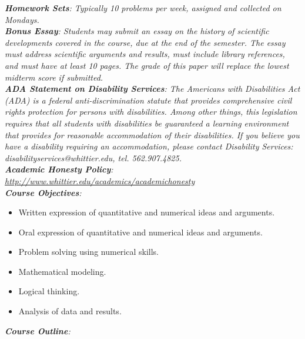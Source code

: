 \documentclass[10pt]{article}
\begin{document}
\textit{\textbf{Homework Sets}: Typically 10 problems per week, assigned and collected on Mondays.} \\
\textit{\textbf{Bonus Essay}: Students may submit an essay on the history of scientific developments covered in the course, due at the end of the semester.  The essay must address scientific arguments and results, must include library references, and must have at least 10 pages.  The grade of this paper will replace the lowest midterm score if submitted.} \\
\textit{\textbf{ADA Statement on Disability Services}: The Americans with Disabilities Act (ADA) is a federal anti-discrimination statute that provides comprehensive civil rights protection for persons with disabilities. Among other things, this legislation requires that all students with disabilities be guaranteed a learning environment that provides for reasonable accommodation of their disabilities. If you believe you have a disability requiring an accommodation, please contact Disability Services: disabilityservices@whittier.edu, tel. 562.907.4825.} \\
\textit{\textbf{Academic Honesty Policy}: \url{http://www.whittier.edu/academics/academichonesty}} \\
\textit{\textbf{Course Objectives}:}
\begin{itemize}
\item Written expression of quantitative and numerical ideas and arguments.
\item Oral expression of quantitative and numerical ideas and arguments.
\item Problem solving using numerical skills.
\item Mathematical modeling.
\item Logical thinking.
\item Analysis of data and results.
\end{itemize}
\small
\textit{\textbf{Course Outline}:}
\end{document}
